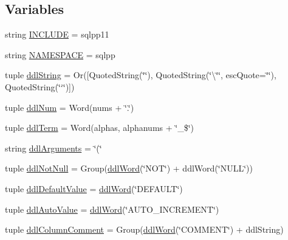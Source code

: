 \subsection*{Variables}
\begin{DoxyCompactItemize}
\item 
string \hyperlink{namespaceddl2cpp_afa346ef1079f78460941e4254c61fd1a}{I\+N\+C\+L\+U\+D\+E} = \textquotesingle{}sqlpp11\textquotesingle{}
\item 
string \hyperlink{namespaceddl2cpp_a650881e2d9dfa08f94412038f5e7cc46}{N\+A\+M\+E\+S\+P\+A\+C\+E} = \textquotesingle{}sqlpp\textquotesingle{}
\item 
tuple \hyperlink{namespaceddl2cpp_ac99a10e162c5dca8118f8f0a0661e378}{ddl\+String} = Or(\mbox{[}Quoted\+String(\char`\"{}\textquotesingle{}\char`\"{}), Quoted\+String(\char`\"{}\textbackslash{}\char`\"{}\char`\"{}, esc\+Quote=\textquotesingle{}\char`\"{}\char`\"{}\textquotesingle{}), Quoted\+String(\char`\"{}`\char`\"{})\mbox{]})
\item 
tuple \hyperlink{namespaceddl2cpp_a4200c1285ee30e3c5069a13092e36b7b}{ddl\+Num} = Word(nums + \char`\"{}.\char`\"{})
\item 
tuple \hyperlink{namespaceddl2cpp_afdb0a60da961822931aa989528d42409}{ddl\+Term} = Word(alphas, alphanums + \char`\"{}\+\_\+\$\char`\"{})
\item 
string \hyperlink{namespaceddl2cpp_ae9ff0a4f026c9fd16644a14821c6ab34}{ddl\+Arguments} = \char`\"{}(\char`\"{}
\item 
tuple \hyperlink{namespaceddl2cpp_a1b17bb7ebb70fb38c91d5e21923602f9}{ddl\+Not\+Null} = Group(\hyperlink{namespaceddl2cpp_aef0136dc79fef19dc9bcece9a6fd2396}{ddl\+Word}(\char`\"{}N\+O\+T\char`\"{}) + ddl\+Word(\char`\"{}N\+U\+L\+L\char`\"{}))
\item 
tuple \hyperlink{namespaceddl2cpp_a4952a8806e1ea497a7d3cf22334247ac}{ddl\+Default\+Value} = \hyperlink{namespaceddl2cpp_aef0136dc79fef19dc9bcece9a6fd2396}{ddl\+Word}(\char`\"{}D\+E\+F\+A\+U\+L\+T\char`\"{})
\item 
tuple \hyperlink{namespaceddl2cpp_adfd7af04711f00ee8c041d1a9dc8a5ff}{ddl\+Auto\+Value} = \hyperlink{namespaceddl2cpp_aef0136dc79fef19dc9bcece9a6fd2396}{ddl\+Word}(\char`\"{}A\+U\+T\+O\+\_\+\+I\+N\+C\+R\+E\+M\+E\+N\+T\char`\"{})
\item 
tuple \hyperlink{namespaceddl2cpp_acd5cc6bf8c3155c1d9b5c96f837a56da}{ddl\+Column\+Comment} = Group(\hyperlink{namespaceddl2cpp_aef0136dc79fef19dc9bcece9a6fd2396}{ddl\+Word}(\char`\"{}C\+O\+M\+M\+E\+N\+T\char`\"{}) + ddl\+String)
\item 

\end{DoxyCompactItemize}
